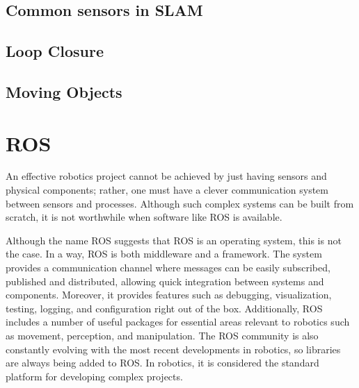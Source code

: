 \subsection{Common sensors in \acs*{SLAM}}

\subsection{Loop Closure}

\subsection{Moving Objects}

\section{\acs{ROS}}

An effective robotics project cannot be achieved by just having sensors and physical components; rather, one must have a clever communication system between sensors and processes. Although such complex systems can be built from scratch, it is not worthwhile when software like \acs*{ROS} is available.

Although the name \acl*{ROS} suggests that ROS is an operating system, this is not the case.  In a way, \acs*{ROS} is both middleware and a framework. The system provides a communication channel where messages can be easily subscribed, published and distributed, allowing quick integration between systems and components. Moreover, it provides features such as debugging, visualization, testing, logging, and configuration right out of the box. Additionally, ROS includes a number of useful packages for essential areas relevant to robotics such as movement, perception, and manipulation. The ROS community is also constantly evolving with the most recent developments in robotics, so libraries are always being added to ROS. In robotics, it is considered the standard platform for developing complex projects.